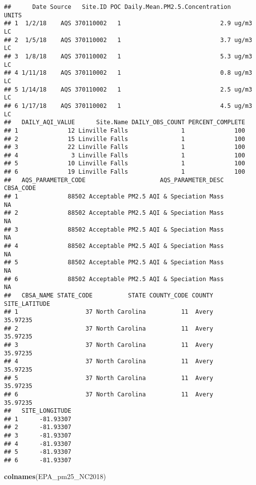 \documentclass[]{article}
\newenvironment{Shaded}{\begin{snugshade}}{\end{snugshade}}
\newcommand{\KeywordTok}[1]{\textcolor[rgb]{0.13,0.29,0.53}{\textbf{#1}}}
\newcommand{\NormalTok}[1]{#1}
\begin{document}
\begin{verbatim}
##      Date Source   Site.ID POC Daily.Mean.PM2.5.Concentration    UNITS
## 1  1/2/18    AQS 370110002   1                            2.9 ug/m3 LC
## 2  1/5/18    AQS 370110002   1                            3.7 ug/m3 LC
## 3  1/8/18    AQS 370110002   1                            5.3 ug/m3 LC
## 4 1/11/18    AQS 370110002   1                            0.8 ug/m3 LC
## 5 1/14/18    AQS 370110002   1                            2.5 ug/m3 LC
## 6 1/17/18    AQS 370110002   1                            4.5 ug/m3 LC
##   DAILY_AQI_VALUE      Site.Name DAILY_OBS_COUNT PERCENT_COMPLETE
## 1              12 Linville Falls               1              100
## 2              15 Linville Falls               1              100
## 3              22 Linville Falls               1              100
## 4               3 Linville Falls               1              100
## 5              10 Linville Falls               1              100
## 6              19 Linville Falls               1              100
##   AQS_PARAMETER_CODE                     AQS_PARAMETER_DESC CBSA_CODE
## 1              88502 Acceptable PM2.5 AQI & Speciation Mass        NA
## 2              88502 Acceptable PM2.5 AQI & Speciation Mass        NA
## 3              88502 Acceptable PM2.5 AQI & Speciation Mass        NA
## 4              88502 Acceptable PM2.5 AQI & Speciation Mass        NA
## 5              88502 Acceptable PM2.5 AQI & Speciation Mass        NA
## 6              88502 Acceptable PM2.5 AQI & Speciation Mass        NA
##   CBSA_NAME STATE_CODE          STATE COUNTY_CODE COUNTY SITE_LATITUDE
## 1                   37 North Carolina          11  Avery      35.97235
## 2                   37 North Carolina          11  Avery      35.97235
## 3                   37 North Carolina          11  Avery      35.97235
## 4                   37 North Carolina          11  Avery      35.97235
## 5                   37 North Carolina          11  Avery      35.97235
## 6                   37 North Carolina          11  Avery      35.97235
##   SITE_LONGITUDE
## 1      -81.93307
## 2      -81.93307
## 3      -81.93307
## 4      -81.93307
## 5      -81.93307
## 6      -81.93307
\end{verbatim}

\begin{Shaded}
\begin{Highlighting}[]
\KeywordTok{colnames}\NormalTok{(EPA_pm25_NC2018)}
\end{Highlighting}
\end{Shaded}
\end{document}
